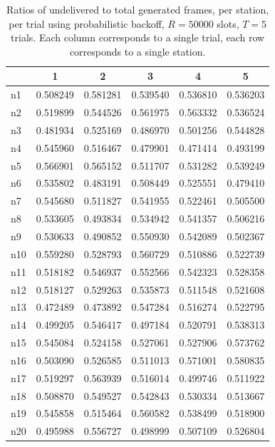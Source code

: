 \documentclass[twocolumn]{article}
\begin{document}
\begin{table}
    \centering 
    \label{fig:fairness_pb}
    \begin{tabular}{l|c|c|c|c|c}
           & 1 & 2 & 3 & 4 & 5 \\
        \hline
        n1 & 0.508249 & 0.581281 & 0.539540  & 0.536810 & 0.536203 \\
        n2 & 0.519899 & 0.544526 & 0.561975  & 0.563332 & 0.536524 \\
        n3 & 0.481934 & 0.525169 & 0.486970  & 0.501256 & 0.544828 \\
        n4 & 0.545960 & 0.516467 & 0.479901  & 0.471414 & 0.493199 \\
        n5 & 0.566901 & 0.565152 & 0.511707  & 0.531282 & 0.539249 \\
        n6 & 0.535802 & 0.483191 & 0.508449  & 0.525551 & 0.479410 \\
        n7 & 0.545680 & 0.511827 & 0.541955  & 0.522461 & 0.505500 \\
        n8 & 0.533605 & 0.493834 & 0.534942  & 0.541357 & 0.506216 \\
        n9 & 0.530633 & 0.490852 & 0.550930  & 0.542089 & 0.502367 \\
       n10 & 0.559280 & 0.528793 & 0.560729  & 0.510886 & 0.522739 \\
       n11 & 0.518182 & 0.546937 & 0.552566  & 0.542323 & 0.528358 \\
       n12 & 0.518127 & 0.529263 & 0.535873  & 0.511548 & 0.521608 \\
       n13 & 0.472489 & 0.473892 & 0.547284  & 0.516274 & 0.522795 \\
       n14 & 0.499205 & 0.546417 & 0.497184  & 0.520791 & 0.538313 \\
       n15 & 0.545084 & 0.524158 & 0.527061  & 0.527906 & 0.573762 \\
       n16 & 0.503090 & 0.526585 & 0.511013  & 0.571001 & 0.580835 \\
       n17 & 0.519297 & 0.563939 & 0.516014  & 0.499746 & 0.511922 \\
       n18 & 0.508870 & 0.549527 & 0.542843  & 0.530334 & 0.513667 \\
       n19 & 0.545858 & 0.515464 & 0.560582  & 0.538499 & 0.518900 \\
       n20 & 0.495988 & 0.556727 & 0.498999  & 0.507109 & 0.526804
    \end{tabular}
    \caption{ Ratios of undelivered to total generated frames, per station, per trial using
       probabilistic backoff, $R=50000$ slots, $T = 5$ trials.
    Each column corresponds to a single trial, each row corresponds to a single station. }

\end{table}
\end{document}
